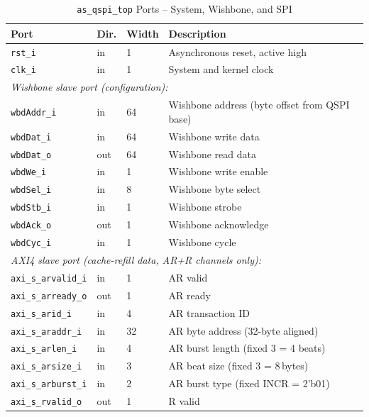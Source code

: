 \begin{table}[H]
\caption{\texttt{as\_qspi\_top} Ports -- System, Wishbone, and SPI}
\label{tab:asQspiPer06}
\centering
\begin{tabularx}{\textwidth}{|l|l|l|X|}
  \hline
  Port & Dir. & Width & Description \\
  \hline\hline
  \texttt{rst\_i}       & in  & 1  & Asynchronous reset, active high \\
  \hline
  \texttt{clk\_i}       & in  & 1  & System and kernel clock \\
  \hline
  \multicolumn{4}{|l|}{\textit{Wishbone slave port (configuration):}} \\
  \hline
  \texttt{wbdAddr\_i}   & in  & 64 & Wishbone address (byte offset from QSPI base) \\
  \hline
  \texttt{wbdDat\_i}    & in  & 64 & Wishbone write data \\
  \hline
  \texttt{wbdDat\_o}    & out & 64 & Wishbone read data \\
  \hline
  \texttt{wbdWe\_i}     & in  & 1  & Wishbone write enable \\
  \hline
  \texttt{wbdSel\_i}    & in  & 8  & Wishbone byte select \\
  \hline
  \texttt{wbdStb\_i}    & in  & 1  & Wishbone strobe \\
  \hline
  \texttt{wbdAck\_o}    & out & 1  & Wishbone acknowledge \\
  \hline
  \texttt{wbdCyc\_i}    & in  & 1  & Wishbone cycle \\
  \hline
  \multicolumn{4}{|l|}{\textit{AXI4 slave port (cache-refill data, AR+R channels only):}} \\
  \hline
  \texttt{axi\_s\_arvalid\_i} & in  & 1  & AR valid \\
  \hline
  \texttt{axi\_s\_arready\_o} & out & 1  & AR ready \\
  \hline
  \texttt{axi\_s\_arid\_i}    & in  & 4  & AR transaction ID \\
  \hline
  \texttt{axi\_s\_araddr\_i}  & in  & 32 & AR byte address (32-byte aligned) \\
  \hline
  \texttt{axi\_s\_arlen\_i}   & in  & 4  & AR burst length (fixed 3 = 4 beats) \\
  \hline
  \texttt{axi\_s\_arsize\_i}  & in  & 3  & AR beat size (fixed 3 = 8\,bytes) \\
  \hline
  \texttt{axi\_s\_arburst\_i} & in  & 2  & AR burst type (fixed INCR = 2'b01) \\
  \hline
  \texttt{axi\_s\_rvalid\_o}  & out & 1  & R valid \\

\end{tabularx}
\end{table}
